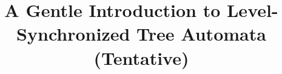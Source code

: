 \documentclass{llncs}
\title{A Gentle Introduction to Level-Synchronized Tree Automata (Tentative)}
\begin{document}
\maketitle


\begin{abstract}

\end{abstract}





\end{document}
